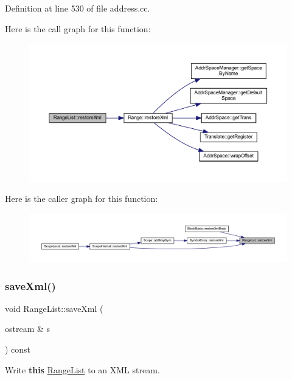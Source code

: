 Definition at line 530 of file address.\+cc.

Here is the call graph for this function\+:
\nopagebreak
\begin{figure}[H]
\begin{center}
\leavevmode
\includegraphics[width=350pt]{class_range_list_a7a7c7b47cec0a38e75169896e08899d0_cgraph}
\end{center}
\end{figure}
Here is the caller graph for this function\+:
\nopagebreak
\begin{figure}[H]
\begin{center}
\leavevmode
\includegraphics[width=350pt]{class_range_list_a7a7c7b47cec0a38e75169896e08899d0_icgraph}
\end{center}
\end{figure}
\mbox{\label{class_range_list_a026dc31507600a1c8786b1d201f7a19e}} 
\subsubsection{\texorpdfstring{saveXml()}{saveXml()}}
{\footnotesize\ttfamily void Range\+List\+::save\+Xml (\begin{DoxyParamCaption}\item[{ostream \&}]{s }\end{DoxyParamCaption}) const}



Write {\bfseries{this}} \mbox{\hyperlink{class_range_list}{Range\+List}} to an X\+ML stream. 

